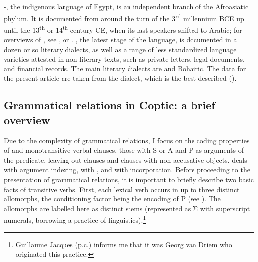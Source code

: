 \documentclass[output=paper]{LSP/langsci}
\begin{document}
-, the indigenous language of Egypt, is an independent branch of the Afroasiatic phylum. It is documented from around the turn of the 3\textsuperscript{rd} millennium BCE up until the 13\textsuperscript{th} or 14\textsuperscript{th} century CE, when its last speakers shifted to Arabic; for overviews of , see \citet{Loprieno1995Egyptian,Loprienoetal2012Ancient,Grossmanetal2015Egyptian-Coptic}, or \citet{Haspelmath2015Egyptian}. , the latest stage of the language, is documented in a dozen or so literary dialects, as well as a range of less standardized language varieties attested in non-literary texts, such as private letters, legal documents, and financial records. The main literary dialects are  and Bohairic. The data for the present article are taken from the  dialect, which is the best described (\citealt{Layton2004Coptic,Reintges2004Coptic,Shisha-Halevy1986Coptic}). 

\subsection{Grammatical relations in Coptic: a brief overview}
\label{05-subsec:3-2}

Due to the complexity of  grammatical relations, I focus on the coding properties of  and monotransitive verbal clauses, \ie those with S or A and P as arguments of the predicate, leaving out  clauses and clauses with non-accusative objects.  deals with argument indexing,  with , and  with incorporation. Before proceeding to the presentation of grammatical relations, it is important to briefly describe two basic facts of  transitive verbs. First, each lexical verb occurs in up to three distinct allomorphs, the conditioning factor being the encoding of P (see ). The allomorphs are labelled here as distinct stems (represented as Σ with superscript numerals, borrowing a practice of  linguistics).\footnote{Guillaume Jacques (p.c.) informs me that it was Georg van Driem who originated this practice.}
\end{document}

